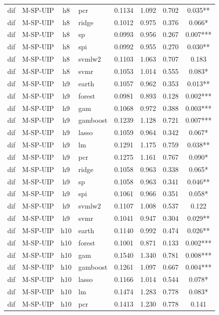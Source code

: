\begin{ThreePartTable}
\begin{longtable}[t]{llclcccc}
dif & M-SP-UIP & h8 & pcr & 0.1134 & 1.092 & 0.702 & 0.035**\\
dif & M-SP-UIP & h8 & ridge & 0.1012 & 0.975 & 0.376 & 0.066*\\
dif & M-SP-UIP & h8 & sp & 0.0993 & 0.956 & 0.267 & 0.007***\\
dif & M-SP-UIP & h8 & spi & 0.0992 & 0.955 & 0.270 & 0.030**\\
dif & M-SP-UIP & h8 & svmlw2 & 0.1103 & 1.063 & 0.707 & 0.183\\
dif & M-SP-UIP & h8 & svmr & 0.1053 & 1.014 & 0.555 & 0.083*\\
\addlinespace
dif & M-SP-UIP & h9 & earth & 0.1057 & 0.962 & 0.353 & 0.013**\\
dif & M-SP-UIP & h9 & forest & 0.0981 & 0.893 & 0.128 & 0.002***\\
dif & M-SP-UIP & h9 & gam & 0.1068 & 0.972 & 0.388 & 0.003***\\
dif & M-SP-UIP & h9 & gamboost & 0.1239 & 1.128 & 0.721 & 0.007***\\
dif & M-SP-UIP & h9 & lasso & 0.1059 & 0.964 & 0.342 & 0.067*\\
dif & M-SP-UIP & h9 & lm & 0.1291 & 1.175 & 0.759 & 0.038**\\
dif & M-SP-UIP & h9 & pcr & 0.1275 & 1.161 & 0.767 & 0.090*\\
dif & M-SP-UIP & h9 & ridge & 0.1058 & 0.963 & 0.338 & 0.065*\\
dif & M-SP-UIP & h9 & sp & 0.1058 & 0.963 & 0.341 & 0.046**\\
dif & M-SP-UIP & h9 & spi & 0.1061 & 0.966 & 0.351 & 0.058*\\
dif & M-SP-UIP & h9 & svmlw2 & 0.1107 & 1.008 & 0.537 & 0.122\\
dif & M-SP-UIP & h9 & svmr & 0.1041 & 0.947 & 0.304 & 0.029**\\
\addlinespace
dif & M-SP-UIP & h10 & earth & 0.1140 & 0.992 & 0.474 & 0.026**\\
dif & M-SP-UIP & h10 & forest & 0.1001 & 0.871 & 0.133 & 0.002***\\
dif & M-SP-UIP & h10 & gam & 0.1540 & 1.340 & 0.781 & 0.008***\\
dif & M-SP-UIP & h10 & gamboost & 0.1261 & 1.097 & 0.667 & 0.004***\\
dif & M-SP-UIP & h10 & lasso & 0.1166 & 1.014 & 0.544 & 0.078*\\
dif & M-SP-UIP & h10 & lm & 0.1474 & 1.283 & 0.778 & 0.083*\\
dif & M-SP-UIP & h10 & pcr & 0.1413 & 1.230 & 0.778 & 0.141\\

\end{longtable}
\end{ThreePartTable}
